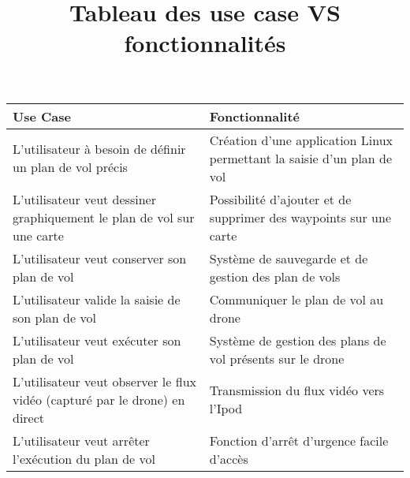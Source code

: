 \documentclass{article}
\date{}
\title{Tableau des use case VS fonctionnalités}
\begin{document}
\maketitle
\begin{center}
\renewcommand{\arraystretch}{1.75}
\begin{tabularx}{16cm}{|X|X|}
	\hline
	Use Case & Fonctionnalité\\
	\hline
	L'utilisateur à besoin de définir un plan de vol précis & Création d'une application Linux permettant la saisie d'un plan de vol\\
	\hline
	L'utilisateur veut dessiner graphiquement le plan de vol sur une carte & Possibilité d'ajouter et de supprimer des waypoints sur une carte\\
	\hline
	L'utilisateur veut conserver son plan de vol & Système de sauvegarde et de gestion des plan de vols\\
	\hline
	L'utilisateur valide la saisie de son plan de vol & Communiquer le plan de vol au drone\\
	\hline
	L'utilisateur veut exécuter son plan de vol & Système de gestion des plans de vol présents sur le drone\\
	\hline
	L'utilisateur veut observer le flux vidéo (capturé par le drone) en direct & Transmission du flux vidéo vers l'Ipod\\
	\hline
	L'utilisateur veut arrêter l'exécution du plan de vol & Fonction d'arrêt d'urgence facile d'accès\\
	\hline
\end{tabularx}

\end{center}
\end{document}
